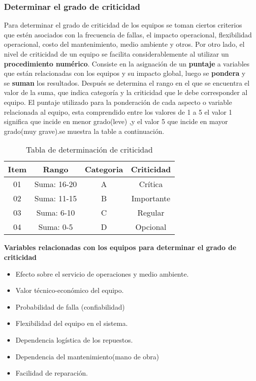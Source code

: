 \documentclass[
	12pt, %
	fleqn, %
	a4paper, %
	oneside, %
]{LegrandOrangeBook}
\begin{document}
\subsubsection{Determinar el grado de criticidad}
Para determinar el grado de criticidad de los equipos se toman ciertos criterios que estén asociados con la frecuencia de fallas, el impacto operacional, flexibilidad operacional, costo del mantenimiento, medio ambiente y otros. Por otro lado, el nivel de criticidad de un equipo se facilita considerablemente al utilizar un \textbf{procedimiento numérico}. Consiste en la asignación de un \textbf{puntaje} a variables que están relacionadas con los equipos y su impacto global, luego se \textbf{pondera} y se \textbf{suman} los resultados. Después se determina el rango en el que se encuentra el valor de la suma, que indica categoría y la criticidad que le debe corresponder al equipo. El puntaje utilizado para la ponderación de cada aspecto o variable relacionada al equipo, esta comprendido entre los valores de 1 a 5 el valor 1 significa que incide en menor grado(leve) ,y el valor 5 que incide en mayor grado(muy grave).se muestra la table a continuación.
\begin{table}[H]
\begin{center}
\begin{tabular}{|c|c|c|c|}
\hline
\rowcolor[HTML]{C0C0C0} 
Item & Rango       & Categoria & Criticidad \\ \hline
01   & Suma: 16-20 & A         & Crítica    \\ \hline
02   & Suma: 11-15 & B         & Importante \\ \hline
03   & Suma: 6-10  & C         & Regular    \\ \hline
04   & Suma: 0-5   & D         & Opcional   \\ \hline
\end{tabular}
\end{center}
\caption{Tabla de determinación de criticidad}
\end{table}
\textbf{Variables relacionadas con los equipos para determinar el grado de criticidad}
\begin{itemize}
\item Efecto sobre el servicio de operaciones y medio ambiente.
\item Valor técnico-económico del equipo.
\item Probabilidad de falla (confiabilidad)
\item Flexibilidad del equipo en el sistema.
\item Dependencia logística de los repuestos.
\item Dependencia del mantenimiento(mano de obra)
\item Facilidad de reparación.
\end{itemize}
\end{document}
